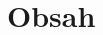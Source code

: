 \documentclass[10pt,a4paper]{article}
\begin{document}
\thispagestyle{empty}
\pagestyle{empty}
\section*{Obsah}
\begin{multicols}{3}
\sf

\end{multicols}
\end{document}
